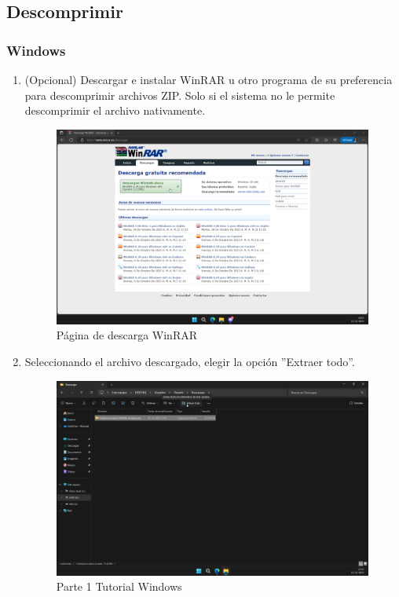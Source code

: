 \subsection*{Descomprimir}

\subsubsection*{Windows}

\begin{enumerate}[label=\arabic*.-]
    \item (Opcional) Descargar e instalar WinRAR u otro programa de su preferencia para descomprimir archivos ZIP. Solo si el sistema no le permite descomprimir el archivo nativamente.
    \begin{figure}[ht]
        \centering
        \includegraphics[width=10.5cm]{figures/TutorialWindows/winrar.png}
        \caption{Página de descarga WinRAR}
        \label{fig:winrar}
    \end{figure}

    \item Seleccionando el archivo descargado, elegir la opción ''Extraer todo''.
\begin{figure}[ht]
    \centering
    \includegraphics[width=10.5cm]{figures/TutorialWindows/tutorial (6).png}
    \caption{Parte 1 Tutorial Windows}
    \label{fig:tutowin1}
\end{figure}
\clearpage


\end{enumerate}
